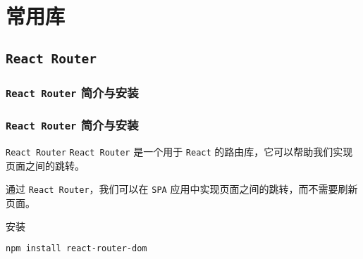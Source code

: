 \documentclass{beamer}
\begin{document}
\section{常用库}
\subsection{\texttt{React Router}}
\subsubsection{\texttt{React Router} 简介与安装}
\begin{frame}
  \frametitle{\texttt{React Router} 简介与安装}

  \begin{block}{\texttt{React Router}}
    \texttt{React Router} 是一个用于 \texttt{React} 的路由库，它可以帮助我们实现页面之间的跳转。
  \end{block}

  通过 \texttt{React Router}，我们可以在 \texttt{SPA} 应用中实现页面之间的跳转，而不需要刷新页面。

  \framebreak

  \begin{block}{安装}
    \begin{lstlisting}[language=bash]
    npm install react-router-dom
    \end{lstlisting}
  \end{block}
\end{frame}
\end{document}

